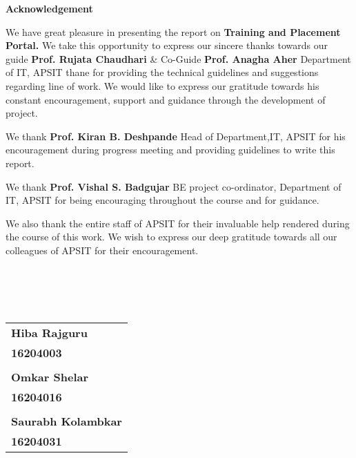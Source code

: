 \newpage
\thispagestyle{empty}
\vspace*{0.2cm}
\vspace{1cm}
\begin{center}
 \large\textbf{Acknowledgement}
\end{center}
\vspace{2cm}
\par 
We have great pleasure in presenting the report on \textbf{Training and Placement Portal.} We take this opportunity to express our sincere thanks towards our guide \textbf{Prof. Rujata Chaudhari} \& Co-Guide \textbf{Prof. Anagha Aher} Department of IT, APSIT thane for providing the technical guidelines and suggestions regarding line of work. We would like to express our gratitude towards his constant encouragement, support and guidance through the development of project. 
\\
\par 
We thank \textbf {Prof. Kiran B. Deshpande} Head of Department,IT, APSIT for his encouragement during progress meeting and providing guidelines to write this report.
\\
\par 
We thank \textbf{Prof. Vishal S. Badgujar}  BE project co-ordinator, Department of IT, APSIT for being encouraging throughout the course and for guidance.
\\
\par
We also thank the entire staff of APSIT for their invaluable help rendered during the course of this work. We wish to express our deep gratitude towards all our colleagues of APSIT for their encouragement.
\\
\\
\\
\\
\\
\hfill
\begin{tabular}{@{}l@{}}
\hspace{122 mm} \textbf {Hiba Rajguru}\\
\hspace{122 mm} \textbf{16204003} \\
\\
\hspace{122 mm} \textbf {Omkar Shelar}\\
\hspace{122 mm} \textbf{16204016} \\
\\
\hspace{122 mm} \textbf {Saurabh Kolambkar}\\
\hspace{122 mm} \textbf{16204031} \\
\end{tabular}

\newpage
